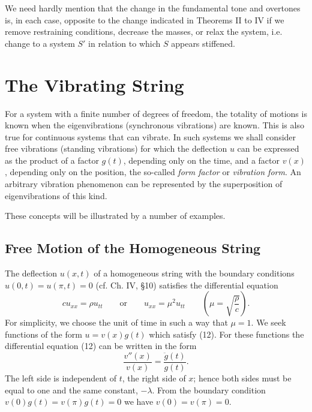 We need hardly mention that the change in the fundamental tone and overtones is, in each case, opposite to the change indicated in Theorems II to IV if we remove restraining conditions, decrease the masses, or relax the system, i.e. change to a system $S'$ in relation to which $S$ appears stiffened.

\section{The Vibrating String}
For a system with a finite number of degrees of freedom, the totality of motions is known when the eigenvibrations (synchronous vibrations) are known. This is also true for continuous systems that can vibrate. In such systems we shall consider free vibrations (standing vibrations) for which the deflection $u$ can be expressed as the product of a factor $g(t)$, depending only on the time, and a factor $v(x)$, depending only on the position, the so-called \emph{form factor} or \emph{vibration form}. An arbitrary vibration phenomenon can be represented by the superposition of eigenvibrations of this kind.

These concepts will be illustrated by a number of examples.

\subsection{Free Motion of the Homogeneous String}
The deflection $u(x,t)$ of a homogeneous string with the boundary conditions $u(0,t)=u(\pi,t)=0$ (cf. Ch. IV, \S10) satisfies the differential equation
\begin{equation}\tag{12}
cu_{xx}=\rho u_{tt}\qquad\text{or}\qquad u_{xx}=\mu^2u_{tt}\qquad\left(\mu=\sqrt{\frac{\rho}{c}}\right).
\end{equation}
For simplicity, we choose the unit of time in such a way that $\mu=1$. We seek functions of the form $u=v(x)g(t)$ which satisfy (12). For these functions the differential equation (12) can be written in the form
\[
\frac{v''(x)}{v(x)}=\frac{\ddot g(t)}{g(t)}.
\]
The left side is independent of $t$, the right side of $x$; hence both sides must be equal to one and the same constant, $-\lambda$. From the boundary condition $v(0)g(t)=v(\pi)g(t)=0$ we have $v(0)=v(\pi)=0$.

